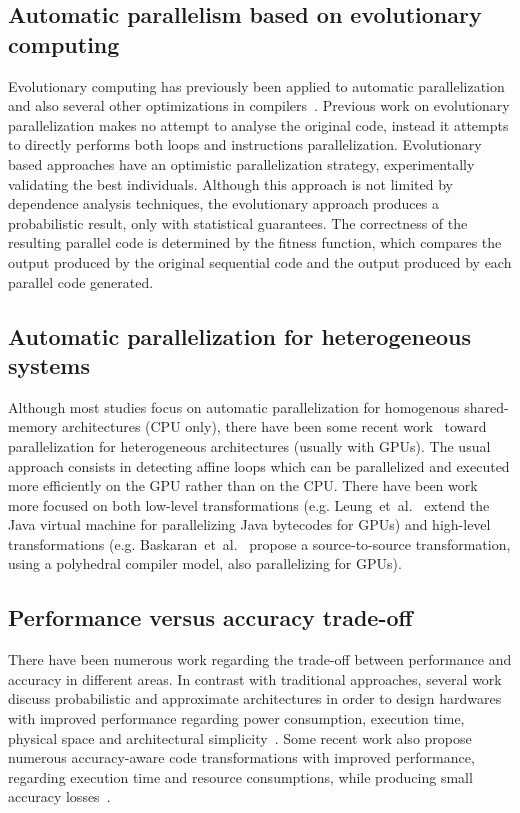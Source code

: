 \documentclass[a4paper,12pt]{article}
\newcommand{\etal}{et~al.}
\begin{document}
\subsection{Automatic parallelism based on evolutionary computing}

Evolutionary computing has previously been applied to automatic parallelization
and also several other optimizations in
compilers~\cite{walsh95,walsh96,williams96,williams99,schulte14a}.  Previous
work on evolutionary parallelization makes no attempt to analyse the original
code, instead it attempts to directly performs both loops and instructions
parallelization.  Evolutionary based approaches have an optimistic
parallelization strategy, experimentally validating the best individuals.
Although this approach is not limited by dependence analysis techniques, the
evolutionary approach produces a probabilistic result, only with statistical
guarantees.  The correctness of the resulting parallel code is determined by
the fitness function, which compares the output produced by the original
sequential code and the output produced by each parallel code generated.

\subsection{Automatic parallelization for heterogeneous systems}

Although most studies focus on automatic parallelization for homogenous
shared-memory architectures (CPU only), there have been some recent
work~\cite{leung09,baskaran10,amini12,govindarajan13} toward parallelization
for heterogeneous architectures (usually with GPUs).  The usual approach
consists in detecting affine loops which can be parallelized and executed more
efficiently on the GPU rather than on the CPU.  There have been work more
focused on both low-level transformations (e.g. Leung~\etal~\cite{leung09}
extend the Java virtual machine for parallelizing Java bytecodes for GPUs) and
high-level transformations (e.g. Baskaran~\etal~\cite{baskaran08,baskaran10}
propose a source-to-source transformation, using a polyhedral compiler model,
also parallelizing for GPUs).

\subsection{Performance versus accuracy trade-off}
\label{subsec:perfvsacc}

There have been numerous work regarding the trade-off between performance and
accuracy in different areas.  In contrast with traditional approaches, several
work discuss probabilistic and approximate architectures in order to design
hardwares with improved performance regarding power consumption, execution
time, physical space and architectural
simplicity~\cite{palem09,palem12,lingamneni12,kirsch12}.  Some recent work also
propose numerous accuracy-aware code transformations with improved performance,
regarding execution time and resource consumptions, while producing small
accuracy losses~\cite{misailovic11,douskos11,zhu12}.
\end{document}
